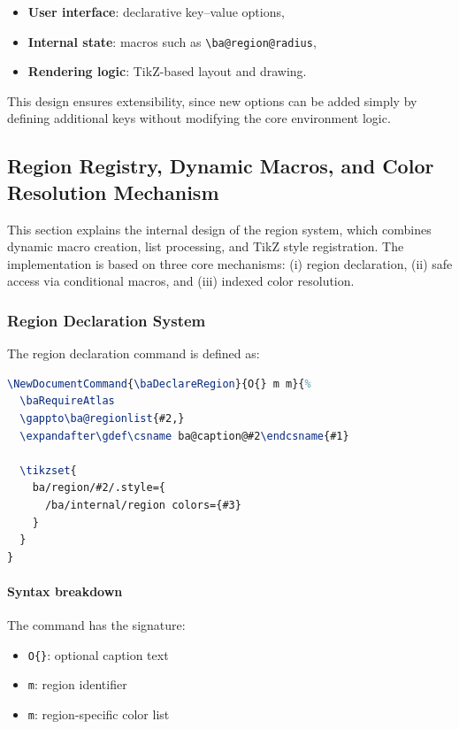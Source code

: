 \begin{itemize}
\item \textbf{User interface}: declarative key--value options,
\item \textbf{Internal state}: macros such as \lstinline|\ba@region@radius|,
\item \textbf{Rendering logic}: TikZ-based layout and drawing.
\end{itemize}

This design ensures extensibility, since new options can be added simply by defining additional keys without modifying the core environment logic.

\subsection{Region Registry, Dynamic Macros, and Color Resolution Mechanism}

This section explains the internal design of the region system, which combines dynamic macro creation, list processing, and TikZ style registration. The implementation is based on three core mechanisms: (i) region declaration, (ii) safe access via conditional macros, and (iii) indexed color resolution.

\subsubsection{Region Declaration System}

The region declaration command is defined as:

\begin{lstlisting}[language=LaTeX]
\NewDocumentCommand{\baDeclareRegion}{O{} m m}{%
  \baRequireAtlas
  \gappto\ba@regionlist{#2,}
  \expandafter\gdef\csname ba@caption@#2\endcsname{#1}

  \tikzset{
    ba/region/#2/.style={
      /ba/internal/region colors={#3}
    }
  }
}
\end{lstlisting}

\paragraph{Syntax breakdown}

The command has the signature:

\begin{itemize}
\item \texttt{O\{\}}: optional caption text
\item \texttt{m}: region identifier
\item \texttt{m}: region-specific color list
\end{itemize}

